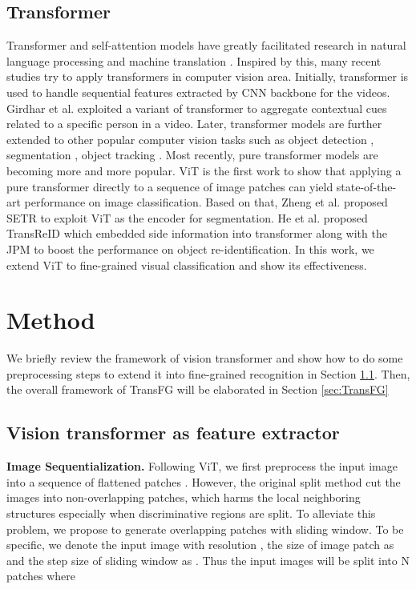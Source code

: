 \documentclass[10pt,twocolumn,letterpaper]{article}
\begin{document}
\subsection{Transformer} 
Transformer and self-attention models have greatly facilitated research in natural language processing and machine translation \cite{dai2019transformer, devlin2018bert, vaswani2017attention, yang2019xlnet}. Inspired by this, many recent studies try to apply transformers in computer vision area. Initially, transformer is used to handle sequential features extracted by CNN backbone for the videos. Girdhar et al. \cite{girdhar2019video} exploited a variant of transformer to aggregate contextual cues related to a specific person in a video. Later, transformer models are further extended to other popular computer vision tasks such as object detection \cite{carion2020end}, segmentation \cite{xie2021trans2seg, chen2021transunet, yun2021spectr}, object tracking \cite{sun2020transtrack}.
Most recently, pure transformer models are becoming more and more popular. ViT \cite{dosovitskiy2020image} is the first work to show that applying a pure transformer directly to a sequence of image patches can yield state-of-the-art performance on image classification. Based on that, Zheng et al. \cite{zheng2020rethinking} proposed SETR to exploit ViT as the encoder for segmentation. He et al. \cite{he2021transreid} proposed TransReID which embedded side information into transformer along with the JPM to boost the performance on object re-identification. In this work, we extend ViT to fine-grained visual classification and show its effectiveness.  \section{Method}

We briefly review the framework of vision transformer and show how to do some preprocessing steps to extend it into fine-grained recognition in Section \ref{sec:ViT}. Then, the overall framework of TransFG will be elaborated in Section \ref{sec:TransFG}

\subsection{Vision transformer as feature extractor}
\label{sec:ViT}

\textbf{Image Sequentialization.} Following ViT, we first preprocess the input image into a sequence of flattened patches . However, the original split method cut the images into non-overlapping patches, which harms the local neighboring structures especially when discriminative regions are split. To alleviate this problem, we propose to generate overlapping patches with sliding window. To be specific, we denote the input image with resolution , the size of image patch as  and the step size of sliding window as . Thus the input images will be split into N patches where
\end{document}

